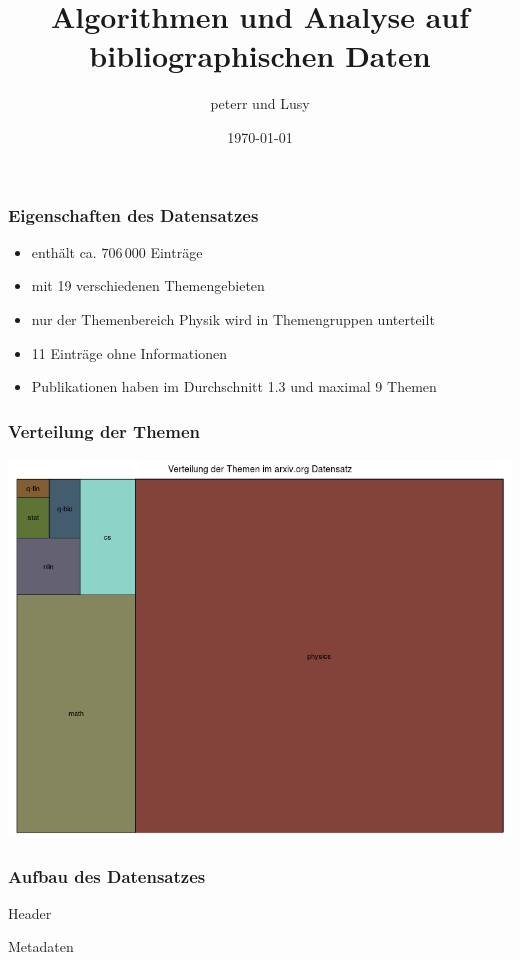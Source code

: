\documentclass[12pt, xcolor=table]{beamer}
\begin{document}
\title{Algorithmen und Analyse auf bibliographischen Daten}
\author{peterr und Lusy}
\date{\today}

\begin{frame}
	\titlepage
\end{frame}

\begin{frame}
	\frametitle{Eigenschaften des Datensatzes}
	\begin{itemize}
		\item  enthält ca. $706\,000$ Einträge
		\item  mit 19 verschiedenen Themengebieten
		\item  nur der Themenbereich Physik wird in Themengruppen unterteilt
		\item  11 Einträge ohne Informationen
		\item  Publikationen haben im Durchschnitt 1.3 und maximal 9 Themen
	\end{itemize}
\end{frame}

\begin{frame}
	\frametitle{Verteilung der Themen}
	\begin{center}
		\includegraphics[scale=0.35]{../../visual/treeParent2.png}
	\end{center}
\end{frame}
\begin{frame}[fragile]
	\frametitle{Aufbau des Datensatzes}
	\begin{block}{Header}
	\end{block}
	\begin{block}{Metadaten}
	\end{block}
\end{frame}
\end{document}
